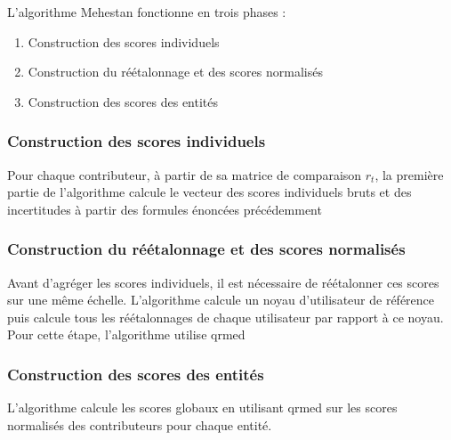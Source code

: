 L'algorithme Mehestan fonctionne en trois phases :

\begin{enumerate}
    \item Construction des scores individuels
    \item Construction du réétalonnage et des scores normalisés
    \item Construction des scores des entités
\end{enumerate}
\subsubsection{Construction des scores individuels}

Pour chaque contributeur, à partir de sa matrice de comparaison $r_t$, la première partie de l'algorithme calcule le vecteur des scores individuels bruts et des incertitudes à partir des formules énoncées précédemment

\subsubsection{Construction du réétalonnage et des scores normalisés}

Avant d'agréger les scores individuels, il est nécessaire de réétalonner ces scores sur une même échelle. L'algorithme calcule un noyau d'utilisateur de référence puis calcule tous les réétalonnages de chaque utilisateur par rapport à ce noyau. Pour cette étape, l'algorithme utilise \gls{qrmed}

\subsubsection{Construction des scores des entités}

L'algorithme calcule les scores globaux en utilisant \gls{qrmed} sur les scores normalisés des contributeurs pour chaque entité.


\pagebreak

